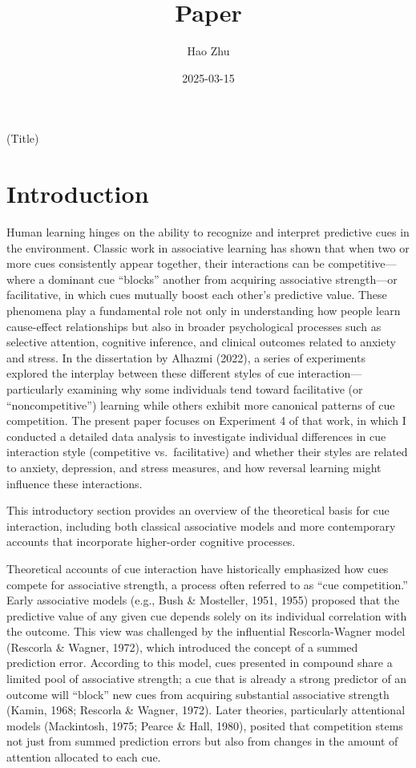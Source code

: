 \documentclass[
  letterpaper,
  DIV=11,
  numbers=noendperiod]{scrartcl}
\title{Paper}
\author{Hao Zhu}
\date{2025-03-15}
\begin{document}
\maketitle


(Title)

\section{Introduction}\label{introduction}

Human learning hinges on the ability to recognize and interpret
predictive cues in the environment. Classic work in associative learning
has shown that when two or more cues consistently appear together, their
interactions can be competitive---where a dominant cue ``blocks''
another from acquiring associative strength---or facilitative, in which
cues mutually boost each other's predictive value. These phenomena play
a fundamental role not only in understanding how people learn
cause-effect relationships but also in broader psychological processes
such as selective attention, cognitive inference, and clinical outcomes
related to anxiety and stress. In the dissertation by Alhazmi (2022), a
series of experiments explored the interplay between these different
styles of cue interaction---particularly examining why some individuals
tend toward facilitative (or ``noncompetitive'') learning while others
exhibit more canonical patterns of cue competition. The present paper
focuses on Experiment 4 of that work, in which I conducted a detailed
data analysis to investigate individual differences in cue interaction
style (competitive vs.~facilitative) and whether their styles are
related to anxiety, depression, and stress measures, and how reversal
learning might influence these interactions.

This introductory section provides an overview of the theoretical basis
for cue interaction, including both classical associative models and
more contemporary accounts that incorporate higher-order cognitive
processes.

Theoretical accounts of cue interaction have historically emphasized how
cues compete for associative strength, a process often referred to as
``cue competition.'' Early associative models (e.g., Bush \& Mosteller,
1951, 1955) proposed that the predictive value of any given cue depends
solely on its individual correlation with the outcome. This view was
challenged by the influential Rescorla-Wagner model (Rescorla \& Wagner,
1972), which introduced the concept of a summed prediction error.
According to this model, cues presented in compound share a limited pool
of associative strength; a cue that is already a strong predictor of an
outcome will ``block'' new cues from acquiring substantial associative
strength (Kamin, 1968; Rescorla \& Wagner, 1972). Later theories,
particularly attentional models (Mackintosh, 1975; Pearce \& Hall,
1980), posited that competition stems not just from summed prediction
errors but also from changes in the amount of attention allocated to
each cue.
\end{document}

